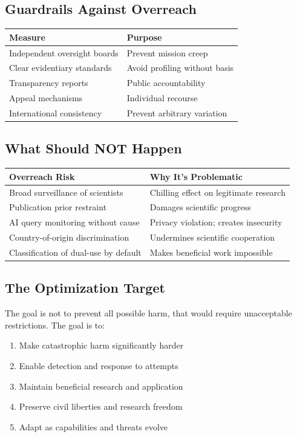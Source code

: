 \documentclass[11pt,letterpaper]{article}
\begin{document}
\subsection{Guardrails Against Overreach}

\begin{center}
\small
\begin{tabular}{L{4cm}L{8cm}}
\toprule
\textbf{Measure} & \textbf{Purpose} \\
\midrule
Independent oversight boards & Prevent mission creep \\
Clear evidentiary standards & Avoid profiling without basis \\
Transparency reports & Public accountability \\
Appeal mechanisms & Individual recourse \\
International consistency & Prevent arbitrary variation \\
\bottomrule
\end{tabular}
\end{center}

\subsection{What Should NOT Happen}

\begin{center}
\small
\begin{tabular}{L{4cm}L{8cm}}
\toprule
\textbf{Overreach Risk} & \textbf{Why It's Problematic} \\
\midrule
Broad surveillance of scientists & Chilling effect on legitimate research \\
Publication prior restraint & Damages scientific progress \\
AI query monitoring without cause & Privacy violation; creates insecurity \\
Country-of-origin discrimination & Undermines scientific cooperation \\
Classification of dual-use by default & Makes beneficial work impossible \\
\bottomrule
\end{tabular}
\end{center}

\subsection{The Optimization Target}

The goal is not to prevent all possible harm, that would require unacceptable restrictions. The goal is to:
\begin{enumerate}
  \item Make catastrophic harm significantly harder
  \item Enable detection and response to attempts
  \item Maintain beneficial research and application
  \item Preserve civil liberties and research freedom
  \item Adapt as capabilities and threats evolve
\end{enumerate}
\end{document}
